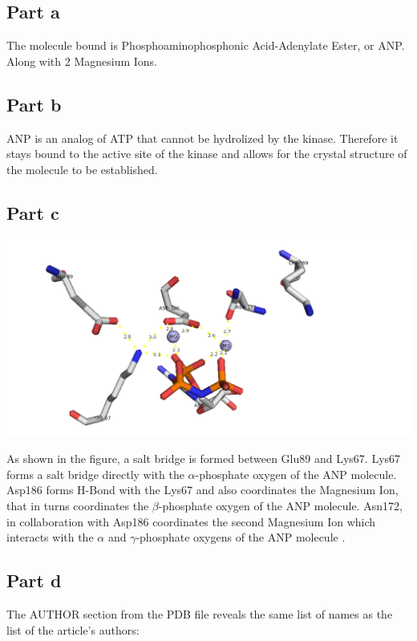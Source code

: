 \documentclass[11pt, a4paper,titlepage]{article}
\begin{document}
\subsection{Part a}

The molecule bound is Phosphoaminophosphonic Acid-Adenylate Ester, or
ANP. Along with 2 Magnesium Ions.

\subsection{Part b}
ANP is an analog of ATP that cannot be hydrolized by the
kinase. Therefore it stays bound to the active site of the kinase and
allows for the crystal structure of the molecule to be established.

\subsection{Part c}

\includegraphics[width=15cm]{./Figures/4c.png}

As shown in the figure, a salt bridge is formed between Glu89 and
Lys67.  Lys67 forms a salt bridge directly with the $\alpha$-phosphate
oxygen of the ANP molecule. Asp186 forms H-Bond with the Lys67 and
also coordinates the Magnesium Ion, that in turns coordinates the
$\beta$-phosphate oxygen of the ANP molecule. Asn172, in collaboration
with Asp186 coordinates the second Magnesium Ion which interacts with
the $\alpha$ and $\gamma$-phosphate oxygens of the ANP molecule
\cite{CSPim1Kinase}.

\subsection{Part d}

The AUTHOR section from the PDB file reveals the same list of names as
the list of the article's authors:
\end{document}
